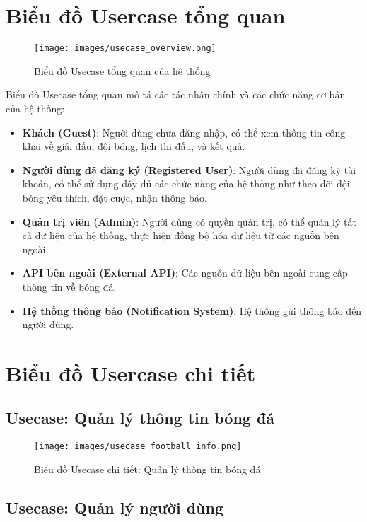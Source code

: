 \documentclass[a4paper,12pt]{report}
\begin{document}
\section{Biểu đồ Usercase tổng quan}

\begin{figure}[H]
\centering
\texttt{[image: images/usecase\_overview.png]}
\caption{Biểu đồ Usecase tổng quan của hệ thống}
\label{fig:usecase-overview}
\end{figure}

Biểu đồ Usecase tổng quan mô tả các tác nhân chính và các chức năng cơ bản của hệ thống:

\begin{itemize}
    \item \textbf{Khách (Guest)}: Người dùng chưa đăng nhập, có thể xem thông tin công khai về giải đấu, đội bóng, lịch thi đấu, và kết quả.
    \item \textbf{Người dùng đã đăng ký (Registered User)}: Người dùng đã đăng ký tài khoản, có thể sử dụng đầy đủ các chức năng của hệ thống như theo dõi đội bóng yêu thích, đặt cược, nhận thông báo.
    \item \textbf{Quản trị viên (Admin)}: Người dùng có quyền quản trị, có thể quản lý tất cả dữ liệu của hệ thống, thực hiện đồng bộ hóa dữ liệu từ các nguồn bên ngoài.
    \item \textbf{API bên ngoài (External API)}: Các nguồn dữ liệu bên ngoài cung cấp thông tin về bóng đá.
    \item \textbf{Hệ thống thông báo (Notification System)}: Hệ thống gửi thông báo đến người dùng.
\end{itemize}

\section{Biểu đồ Usercase chi tiết}

\subsection{Usecase: Quản lý thông tin bóng đá}

\begin{figure}[H]
\centering
\texttt{[image: images/usecase\_football\_info.png]}
\caption{Biểu đồ Usecase chi tiết: Quản lý thông tin bóng đá}
\label{fig:usecase-football-info}
\end{figure}

\subsection{Usecase: Quản lý người dùng}
\end{document}
